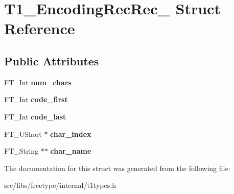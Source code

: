 \hypertarget{struct_t1___encoding_rec_rec__}{
\section{T1\_\-EncodingRecRec\_\- Struct Reference}
\label{struct_t1___encoding_rec_rec__}
}
\subsection*{Public Attributes}
\begin{DoxyCompactItemize}
\item 
\hypertarget{struct_t1___encoding_rec_rec___af1468d5bad99cccebeb0387713999e9c}{
FT\_\-Int {\bfseries num\_\-chars}}
\label{struct_t1___encoding_rec_rec___af1468d5bad99cccebeb0387713999e9c}

\item 
\hypertarget{struct_t1___encoding_rec_rec___ae21aad8cbb10c8fd94e9f30c60542662}{
FT\_\-Int {\bfseries code\_\-first}}
\label{struct_t1___encoding_rec_rec___ae21aad8cbb10c8fd94e9f30c60542662}

\item 
\hypertarget{struct_t1___encoding_rec_rec___a9be1faadf0ce11d12d3bce600e1f2a9d}{
FT\_\-Int {\bfseries code\_\-last}}
\label{struct_t1___encoding_rec_rec___a9be1faadf0ce11d12d3bce600e1f2a9d}

\item 
\hypertarget{struct_t1___encoding_rec_rec___a0c00a7b5c5ec7ba5eba667252f11f199}{
FT\_\-UShort $\ast$ {\bfseries char\_\-index}}
\label{struct_t1___encoding_rec_rec___a0c00a7b5c5ec7ba5eba667252f11f199}

\item 
\hypertarget{struct_t1___encoding_rec_rec___acf21f77cff90336fb9f297799aaf26eb}{
FT\_\-String $\ast$$\ast$ {\bfseries char\_\-name}}
\label{struct_t1___encoding_rec_rec___acf21f77cff90336fb9f297799aaf26eb}

\end{DoxyCompactItemize}


The documentation for this struct was generated from the following file:\begin{DoxyCompactItemize}
\item 
src/libs/freetype/internal/t1types.h\end{DoxyCompactItemize}

